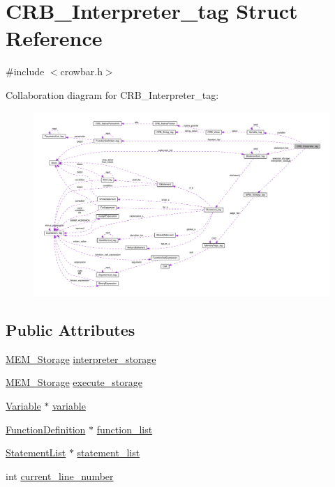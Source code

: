 \hypertarget{struct_c_r_b___interpreter__tag}{}\section{C\+R\+B\+\_\+\+Interpreter\+\_\+tag Struct Reference}
\label{struct_c_r_b___interpreter__tag}


{\ttfamily \#include $<$crowbar.\+h$>$}



Collaboration diagram for C\+R\+B\+\_\+\+Interpreter\+\_\+tag\+:\nopagebreak
\begin{figure}[H]
\begin{center}
\leavevmode
\includegraphics[width=350pt]{struct_c_r_b___interpreter__tag__coll__graph}
\end{center}
\end{figure}
\subsection*{Public Attributes}
\begin{DoxyCompactItemize}
\item 
\hyperlink{_m_e_m_8h_afc904fd630ab1c716f8e0a1096f62697}{M\+E\+M\+\_\+\+Storage} \hyperlink{struct_c_r_b___interpreter__tag_a6959871398b2d3b1711e9f80a3e2dd4e}{interpreter\+\_\+storage}
\item 
\hyperlink{_m_e_m_8h_afc904fd630ab1c716f8e0a1096f62697}{M\+E\+M\+\_\+\+Storage} \hyperlink{struct_c_r_b___interpreter__tag_acbd5f1ff1ab29110408a2e41a98196d0}{execute\+\_\+storage}
\item 
\hyperlink{crowbar_8h_a070c86ad7ae39536aed471927d04dee4}{Variable} $\ast$ \hyperlink{struct_c_r_b___interpreter__tag_a9226949153a3c16dbd27830598997930}{variable}
\item 
\hyperlink{crowbar_8h_ae6685df239452173440b6042201dbd9f}{Function\+Definition} $\ast$ \hyperlink{struct_c_r_b___interpreter__tag_aea5177d1aa33b19f82430f097f95b15b}{function\+\_\+list}
\item 
\hyperlink{crowbar_8h_a8bffae51ec8146f480c3c14c61b4ff93}{Statement\+List} $\ast$ \hyperlink{struct_c_r_b___interpreter__tag_a8d794cdb4f087bf09998f1979062b4f6}{statement\+\_\+list}
\item 
int \hyperlink{struct_c_r_b___interpreter__tag_a0e7113d528b4c75dd34ece37eacbfdfd}{current\+\_\+line\+\_\+number}
\end{DoxyCompactItemize}


